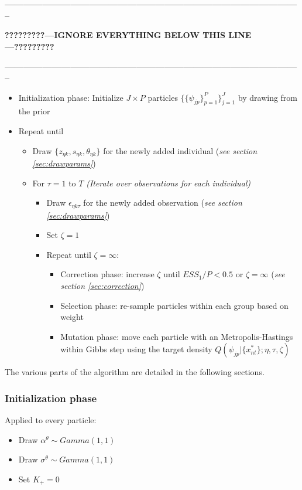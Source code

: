 \documentclass[12pt]{article}
\newcounter{thm}[section]
\begin{document}
\textbf{-----------------------------------------------------------------------------------------------}

\textbf{?????????---IGNORE EVERYTHING BELOW THIS LINE---?????????}

\textbf{-----------------------------------------------------------------------------------------------}
\begin{itemize}
	\item Initialization phase: Initialize $J \times P$ particles $\{\{\psi_{jp}\}_{p=1}^P\}_{j=1}^J$ by drawing from the prior
	\item Repeat until 
	\begin{itemize}
		\item Draw $\{z_{\eta k},s_{\eta k},\theta_{\eta k}\}$ for the newly added individual (\textit{see section \ref{sec:drawparams}})
		\item For $\tau=1$ to $T$ {\it (Iterate over observations for each individual)}
		\begin{itemize}
			\item Draw $\epsilon_{\eta k \tau}$ for the newly added observation (\textit{see section \ref{sec:drawparams}})
			\item Set $\zeta = 1$
			\item Repeat until $\zeta = \infty$:
			\begin{itemize}
				\item Correction phase: increase $\zeta$ until $ESS_1/P<0.5$ or $\zeta=\infty$ (\textit{see section \ref{sec:correction}})
				\item Selection phase: re-sample particles within each group based on weight
				\item Mutation phase: move each particle with an Metropolis-Hastings within Gibbs step using the target density $ Q(\psi_{jp}|\{x_{nt}^*\};\eta,\tau,\zeta) $
			\end{itemize}
		\end{itemize}
	\end{itemize}
\end{itemize}

The various parts of the algorithm are detailed in the following sections.

\subsubsection{Initialization phase}

Applied to every particle:

\begin{itemize}
	\item Draw $\alpha^\theta \sim Gamma(1,1)$
	\item Draw $\sigma^\theta \sim Gamma(1,1)$
	\item Set $K_+ = 0$
\end{itemize}
\end{document}
